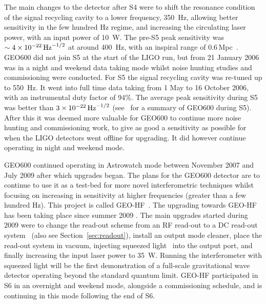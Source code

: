 \documentclass{article}
\begin{document}
The main changes to the detector after S4 were to shift the resonance condition
of the signal recycling cavity to a lower frequency, 350~Hz, allowing better
sensitivity in the few hundred Hz regime, and increasing the circulating laser
power, with an input power of 10~W. The pre-S5 peak sensitivity was
$\sim4\times10^{-22}\,{\rm Hz}^{-1/2}$ at around 400~Hz, with an inspiral
range of 0.6\,Mpc~\cite{Hild:2006b}. GEO600 did not join S5 at the start of the
LIGO run, but from 21 January 2006 was in a night and weekend data taking mode
whilst noise hunting studies and commissioning were conducted. For S5 the signal
recycling cavity was re-tuned up to 550~Hz. It went into full time data taking
from 1 May to 16 October 2006, with an instrumental duty factor of 94\%. The
average peak sensitivity during S5 was better than $3\times10^{-22}\,{\rm
Hz}^{-1/2}$ (see~\cite{Willke:2007} for a summary of GEO600 during S5). After
this it was deemed more valuable for GEO600 to continue more noise hunting and
commissioning work, to give as good a sensitivity as possible for when the LIGO
detectors went offline for upgrading. It did however continue operating in night
and weekend mode.

GEO600  continued operating in Astrowatch mode between November 2007 and July
2009 after which upgrades began. The plans for the GEO600 detector are to
continue to use it as a test-bed for more novel interferometric techniques
whilst focusing on increasing in sensitivity at higher frequencies (greater than
a few hundred Hz). This project is called GEO-HF~\cite{Willke:2006}. The
upgrading towards GEO-HF has been taking place since summer 2009
\cite{Grote:2010}. The main upgrades started during 2009 were to change the
read-out scheme from an RF read-out to a DC read-out system~\cite{Hild:2008}
(also see Section~\ref{sec:readout}), install an output mode cleaner, place the
read-out system in vacuum, injecting squeezed light~\cite{Vahlbruch:2008,
Chelkowski:2007} into the output port, and finally increasing the input laser
power to 35~W. Running the interferometer with squeezed light will be the first
demonstration of a full-scale gravitational wave detector operating beyond the
standard quantum limit. GEO-HF participated in S6 in an overnight and weekend
mode, alongside a commissioning schedule, and is continuing in this mode
following the end of S6.
\end{document}
